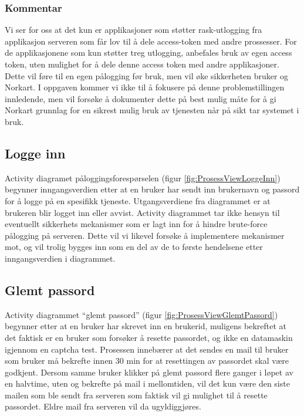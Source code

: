 \subsubsection*{Kommentar}
\label{subsubsec:prosess_view_logge_ut_kommentar}
Vi ser for oss at det kun er applikasjoner som støtter rask-utlogging fra applikasjon serveren som får lov til å dele access-token med andre prossesser. For de applikasjonene som kun støtter treg utlogging, anbefales bruk av egen access token, uten mulighet for å dele denne access token med andre applikasjoner. Dette vil føre til en egen pålogging før bruk, men vil øke sikkerheten bruker og Norkart. I oppgaven kommer vi ikke til å fokusere på denne problemstillingen innledende, men vil forsøke å dokumenter dette på best mulig måte for å gi Norkart grunnlag for en sikrest mulig bruk av tjenesten når på sikt tar systemet i bruk.
\newline

\subsection{Logge inn}
\label{subsec:prosess_view_logge_inn}
Activity diagramet påloggingsforespørselen (figur \ref{fig:ProsessViewLoggeInn}) begynner inngangsverdien etter at en bruker har sendt inn brukernavn og passord for å logge på en spesifikk tjeneste. Utgangsverdiene fra diagrammet er at brukeren blir logget inn eller avvist. Activity diagrammet tar ikke hensyn til eventuellt sikkerhets mekanismer som er lagt inn for å hindre brute-force pålogging på serveren. Dette vil vi likevel forsøke å implementere mekanismer mot, og vil trolig bygges inn som en del av de to første hendelsene etter inngangsverdien i diagrammet.
\newline

\subsection{Glemt passord}
\label{subsec:prosess_view_glemt_passord}
Activity diagrammet “glemt passord” (figur \ref{fig:ProsessViewGlemtPassord}) begynner etter at en bruker har skrevet inn en brukerid, muligens bekreftet at det faktisk er en bruker som forsøker å resette passordet, og ikke en datamaskin igjennom en captcha test. Prosessen innebærer at det sendes en mail til bruker som bruker må bekrefte innen 30 min for at resettingen av passordet skal være godkjent. Dersom samme bruker klikker på glemt passord flere ganger i løpet av en halvtime, uten og bekrefte på mail i mellomtiden, vil det kun være den siste mailen som ble sendt fra serveren som faktisk vil gi mulighet til å resette passordet. Eldre mail fra serveren vil da ugyldiggjøres. 
\newline

